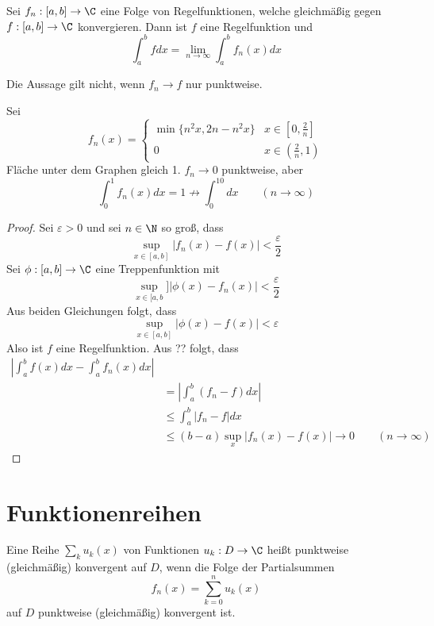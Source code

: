 \documentclass{mycourse}
\begin{document}
\begin{thm}
Sei $f_n:[a,b]\to\C$ eine Folge von Regelfunktionen, welche gleichmäßig gegen $f:[a,b]\to\C$ konvergieren. Dann ist $f$ eine Regelfunktion und
\[
\int_a^bfdx=\lim_{n\to\infty}\int_a^bf_n(x)dx
\]
\begin{note}
Die Aussage gilt nicht, wenn $f_n\to f$ nur punktweise.
\end{note}
\begin{ex*}
Sei
\[
f_n(x)=\begin{cases}
\min\{n^2x,2n-n^2x\}&x\in[0,\frac 2n]\\
0&x\in (\frac 2n, 1)
\end{cases}
\]
Fläche unter dem Graphen gleich 1. $f_n\to 0$ punktweise, aber
\[
\int_0^1f_n(x)dx=1\not\to \int_0^10dx \qquad (n\to\infty)
\]
\end{ex*}
\begin{proof}
Sei $\varepsilon>0$ und sei $n\in\N$ so groß, dass
\[
\sup_{x\in[a,b]}|f_n(x)-f(x)|<\frac{\varepsilon}2
\]
Sei $\phi:[a,b]\to\C$ eine Treppenfunktion mit
\[
\sup_{x\in[a,b}]|\phi(x)-f_n(x)|<\frac{\varepsilon}2
\]
Aus beiden Gleichungen folgt, dass
\[
\sup_{x\in[a,b]}|\phi(x)-f(x)|<\varepsilon
\]
Also ist $f$ eine Regelfunktion.
Aus ?? folgt, dass
\begin{align*}
|\int_a^bf(x)dx-\int_a^bf_n(x)dx|\\
&=|\int_a^b(f_n-f)dx|\\
&\le\int_a^b|f_n-f|dx\\
&\le(b-a)\sup_x|f_n(x)-f(x)|\to 0\qquad (n\to\infty)
\end{align*}
\end{proof}
\end{thm}

\section{Funktionenreihen}

Eine Reihe $\sum_ku_k(x)$ von Funktionen $u_k:D\to\C$ heißt punktweise (gleichmäßig) konvergent auf $D$, wenn die Folge der Partialsummen
\[
f_n(x)=\sum_{k=0}^nu_k(x)
\]
auf $D$ punktweise (gleichmäßig) konvergent ist.
\end{document}
